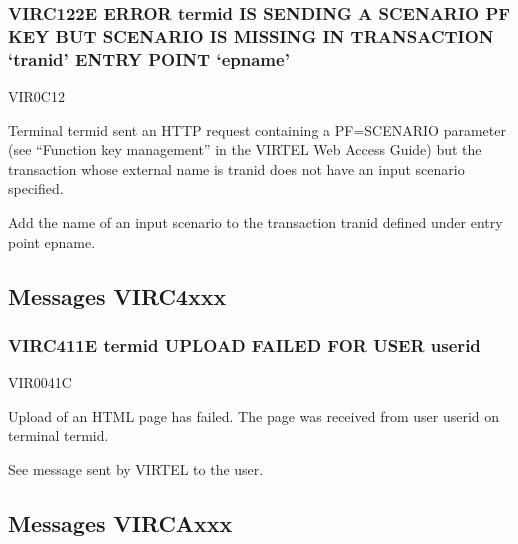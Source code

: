 \documentclass[letterpaper,10pt,english]{sphinxmanual}
\begin{document}
\subsubsection{VIRC122E ERROR termid IS SENDING A SCENARIO PF KEY BUT SCENARIO IS MISSING IN TRANSACTION ‘tranid’ ENTRY POINT ‘epname’}
\label{\detokenize{messages:virc122e-error-termid-is-sending-a-scenario-pf-key-but-scenario-is-missing-in-transaction-tranid-entry-point-epname}}\begin{description}
\sphinxAtStartPar
VIR0C12

\sphinxAtStartPar
Terminal termid sent an HTTP request containing a PF=SCENARIO parameter (see “Function key management” in  the VIRTEL Web Access Guide) but the transaction whose external name is tranid does not have an input scenario specified.

\sphinxAtStartPar
Add the name of an input scenario to the transaction tranid defined under entry point epname.

\end{description}


\subsection{Messages VIRC4xxx}
\label{\detokenize{messages:messages-virc4xxx}}

\subsubsection{VIRC411E termid UPLOAD FAILED FOR USER userid}
\label{\detokenize{messages:virc411e-termid-upload-failed-for-user-userid}}\begin{description}
\sphinxAtStartPar
VIR0041C

\sphinxAtStartPar
Upload of an HTML page has failed. The page was received from user userid on terminal termid.

\sphinxAtStartPar
See message sent by VIRTEL to the user.

\end{description}


\subsection{Messages VIRCAxxx}
\label{\detokenize{messages:messages-vircaxxx}}
\end{document}
